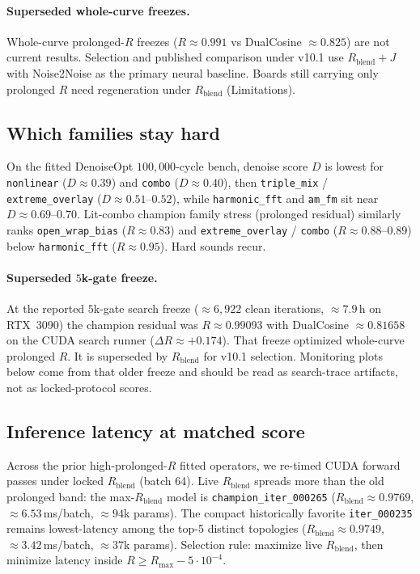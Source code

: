 \paragraph{Superseded whole-curve freezes.}
Whole-curve prolonged-$R$ freezes ($R{\approx}0.991$ vs DualCosine ${\approx}0.825$) are not current results.
Selection and published comparison under v10.1 use $R_{\mathrm{blend}}{+}J$ with Noise2Noise as the primary neural baseline.
Boards still carrying only prolonged $R$ need regeneration under $R_{\mathrm{blend}}$ (Limitations).

\subsection{Which families stay hard}
\label{sec:family-hardness}
On the fitted DenoiseOpt $100{,}000$-cycle bench, denoise score $D$ is lowest for \texttt{nonlinear} ($D\approx 0.39$) and \texttt{combo} ($D\approx 0.40$), then \texttt{triple\_mix} / \texttt{extreme\_overlay} ($D\approx 0.51$--$0.52$), while \texttt{harmonic\_fft} and \texttt{am\_fm} sit near $D\approx 0.69$--$0.70$.
Lit-combo champion family stress (prolonged residual) similarly ranks \texttt{open\_wrap\_bias} ($R\approx 0.83$) and \texttt{extreme\_overlay} / \texttt{combo} ($R\approx 0.88$--$0.89$) below \texttt{harmonic\_fft} ($R\approx 0.95$).
Hard sounds recur.

\paragraph{Superseded $5$k-gate freeze.}
At the reported $5$k-gate search freeze ($\approx 6{,}922$ clean iterations, $\approx 7.9$\,h on RTX~3090) the champion residual was $R\approx 0.99093$ with DualCosine $\approx 0.81658$ on the CUDA search runner ($\Delta R\approx{+}0.174$).
That freeze optimized whole-curve prolonged $R$.
It is superseded by $R_{\mathrm{blend}}$ for v10.1 selection.
Monitoring plots below come from that older freeze and should be read as search-trace artifacts, not as locked-protocol scores.

\subsection{Inference latency at matched score}
\label{sec:inference-latency}
Across the prior high-prolonged-$R$ fitted operators, we re-timed CUDA forward passes under locked $R_{\mathrm{blend}}$ (batch 64).
Live $R_{\mathrm{blend}}$ spreads more than the old prolonged band: the max-$R_{\mathrm{blend}}$ model is
\texttt{champion\_iter\_000265} ($R_{\mathrm{blend}}{\approx}0.9769$, $\approx 6.53$\,ms/batch, $\approx 94$k params).
The compact historically favorite \texttt{iter\_000235} remains lowest-latency among the top-5 distinct topologies
($R_{\mathrm{blend}}{\approx}0.9749$, $\approx 3.42$\,ms/batch, $\approx 37$k params).
Selection rule: maximize live $R_{\mathrm{blend}}$, then minimize latency inside $R\ge R_{\max}-5\cdot10^{-4}$.

